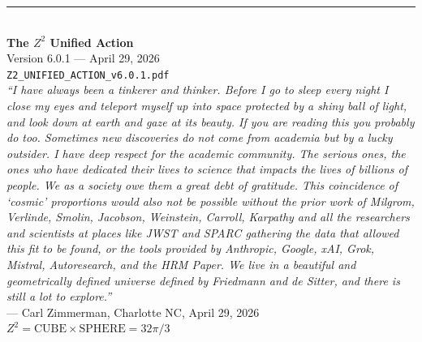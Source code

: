 \documentclass[11pt,a4paper]{article}
\theoremstyle{plain}
\theoremstyle{definition}
\theoremstyle{remark}
\begin{document}
\vspace{2cm}
\begin{center}
\rule{0.8\textwidth}{0.5pt}\\[0.5cm]
\textbf{The $Z^2$ Unified Action}\\[0.3cm]
Version 6.0.1 --- April 29, 2026\\[0.3cm]
\texttt{Z2\_UNIFIED\_ACTION\_v6.0.1.pdf}\\[0.5cm]

\emph{``I have always been a tinkerer and thinker. Before I go to sleep every night I close my eyes and teleport myself up into space protected by a shiny ball of light, and look down at earth and gaze at its beauty. If you are reading this you probably do too. Sometimes new discoveries do not come from academia but by a lucky outsider. I have deep respect for the academic community. The serious ones, the ones who have dedicated their lives to science that impacts the lives of billions of people. We as a society owe them a great debt of gratitude. This coincidence of `cosmic' proportions would also not be possible without the prior work of Milgrom, Verlinde, Smolin, Jacobson, Weinstein, Carroll, Karpathy and all the researchers and scientists at places like JWST and SPARC gathering the data that allowed this fit to be found, or the tools provided by Anthropic, Google, xAI, Grok, Mistral, Autoresearch, and the HRM Paper. We live in a beautiful and geometrically defined universe defined by Friedmann and de Sitter, and there is still a lot to explore.''}\\[0.3cm]
--- Carl Zimmerman, Charlotte NC, April 29, 2026\\[0.5cm]

\textbf{$Z^2 = \text{CUBE} \times \text{SPHERE} = 32\pi/3$}
\end{center}
\end{document}
